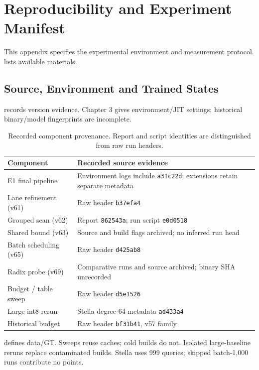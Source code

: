 \chapter{Reproducibility and Experiment Manifest}
\label{app:reproducibility}

This appendix specifies the experimental environment and measurement
protocol.  lists available materials.

\section{Source, Environment and Trained States}

 records version evidence. Chapter 3 gives environment/JIT settings; historical binary/model fingerprints are incomplete.

\begin{table}[tbp]
\centering
\caption[Component and run provenance]{Recorded component provenance. Report and script identities
are distinguished from raw run headers.}
\label{tab:a-components}
\footnotesize\setlength{\tabcolsep}{4pt}
\begin{tabularx}{\linewidth}{@{}>{\raggedright\arraybackslash}p{.34\linewidth}>{\raggedright\arraybackslash}X@{}}
\toprule
Component & Recorded source evidence \\
\midrule
E1 final pipeline & Environment logs include \texttt{a31c22d}; extensions retain separate metadata \\
Lane refinement (v61) & Raw header \texttt{b37efa4} \\
Grouped scan (v62) & Report \texttt{862543a}; run script \texttt{e0d0518} \\
Shared bound (v63) & Source and build flags archived; no inferred run head \\
Batch scheduling (v65) & Raw header \texttt{d425ab8} \\
Radix probe (v69) & Comparative runs and source archived; binary SHA unrecorded \\
Budget / table sweep & Raw header \texttt{d5e1526} \\
Large int8 rerun & Stella degree-64 metadata \texttt{ad433a4} \\
Historical budget & Raw header \texttt{bf31b41}, v57 family \\
\bottomrule
\end{tabularx}
\end{table}

 defines data/GT. Sweeps reuse caches; cold builds do not. Isolated large-baseline reruns replace contaminated builds. Stella uses 999 queries; skipped batch-1,000 runs contribute no points.

